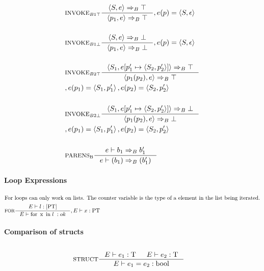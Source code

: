 \begin{align*}
&\inference[$\text{INVOKE}_{B1\top}$]{\Braket{S,e} \Rightarrow_B \top}
                  {\Braket{p_1,e} \Rightarrow_B \top}
                  {,e(p) = \Braket{S,\epsilon}}
\\\\
&\inference[$\text{INVOKE}_{B1\bot}$]{\Braket{S,e} \Rightarrow_B \bot}
                  {\Braket{p_1,e} \Rightarrow_B \bot}
                  {,e(p) = \Braket{S,\epsilon}}
\\\\
&\inference[$\text{INVOKE}_{B2\top}$]{\Braket{S_1,e[p_1' \mapsto \Braket{S_2,p_2'}]} \Rightarrow_B \top}
                  {\Braket{p_1(p_2),e} \Rightarrow_B \top}
\\                  
&                 {,e(p_1) = \Braket{S_1,p_1'}, e(p_2) = \Braket{S_2,p_2'}}
\\\\
&\inference[$\text{INVOKE}_{B2\bot}$]{\Braket{S_1,e[p_1' \mapsto \Braket{S_2,p_2'}]} \Rightarrow_B \bot}
                  {\Braket{p_1(p_2),e} \Rightarrow_B \bot}
\\                  
&                 {,e(p_1) = \Braket{S_1,p_1'}, e(p_2) = \Braket{S_2,p_2'}}
\\\\
&\inference[$\text{PARENS}_\text{B}$]{e \vdash b_1 \Rightarrow_B b_1'}
                       {e \vdash (b_1) \Rightarrow_B (b_1')}
\end{align*}

\paragraph{Loop Expressions}
\begin{align*}
\intertext{For loops can only work on lists. The counter variable is the type of a element in the list being iterated.}
&\inference[FOR]{\Tenv l : [\Tpt]}
                 {\Tenv \mathbin{\text{for}} \; \mathbin{\text{x}} \; \mathbin{\text{in}} \; {l} \; : ok },	 \Tenv x : \Tpt
\end{align*}

\paragraph{Comparison of structs}
\begin{align*}
\intertext{}
&\inference[STRUCT]{\Tenv e_1: \Tt & \Tenv e_2: \Tt}
                 {\Tenv e_1 = e_2: \Tbool}
\end{align*}

